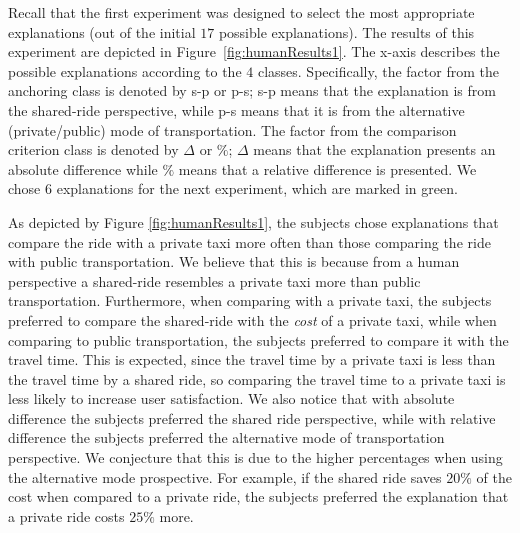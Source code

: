 \documentclass[letterpaper]{article} %
\begin{document}
Recall that the first experiment was designed to select the most appropriate explanations (out of the initial $17$ possible explanations). The results of this experiment are depicted in Figure~\ref{fig:humanResults1}. The x-axis describes the possible explanations according to the $4$ classes. Specifically, the factor from the anchoring class is denoted by s-p or p-s; s-p means that the explanation is from the shared-ride perspective, while p-s means that it is from the alternative (private/public) mode of transportation. The factor from the comparison criterion class is denoted by $\Delta$ or $\%$; $\Delta$ means that the explanation presents an absolute difference while $\%$ means that a relative difference is presented. We chose $6$ explanations for the next experiment, which are marked in green.



As depicted by Figure \ref{fig:humanResults1}, the subjects chose explanations that compare the ride with a private taxi more often than those comparing the ride with public transportation. We believe that this is because from a human perspective a shared-ride resembles a private taxi more than public transportation.
Furthermore, when comparing with a private taxi, the subjects preferred to compare the shared-ride with the \emph{cost} of a private taxi, while when comparing to public transportation, the subjects preferred to compare it with the travel time. This is expected, since the travel time by a private taxi is less than the travel time by a shared ride, so comparing the travel time to a private taxi is less likely to increase user satisfaction. 
We also notice that with absolute difference the subjects preferred the shared ride perspective, while with relative difference the subjects preferred the alternative mode of transportation perspective. We conjecture that this is due to the higher percentages when using the alternative mode prospective. For example, if the shared ride saves $20\%$ of the cost when compared to a private ride, the subjects preferred the explanation that a private ride costs $25\%$ more.
\end{document}
